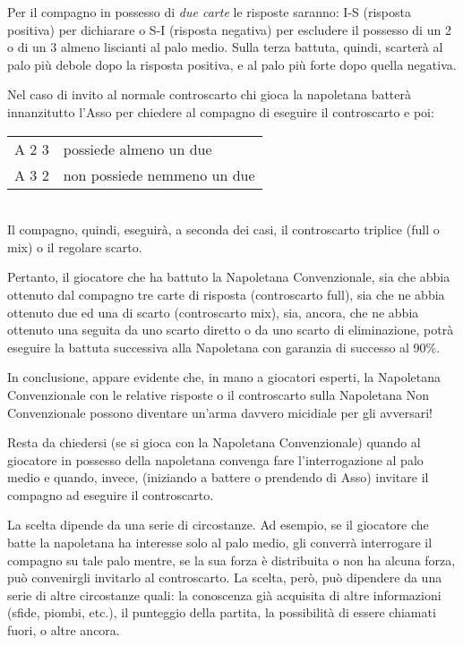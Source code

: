 \documentclass[italian,a4paper]{article}
\begin{document}
Per il compagno in possesso di \emph{due carte} le risposte saranno: I-S (risposta positiva) per dichiarare o S-I (risposta negativa) per escludere il possesso di un 2 o di un 3 almeno liscianti al palo medio.
Sulla terza battuta, quindi, scarterà al palo più debole dopo la
risposta positiva, e al palo più forte dopo quella negativa.

Nel caso di invito al normale controscarto chi gioca la napoletana batterà innanzitutto l'Asso per chiedere al compagno di eseguire il controscarto e poi:
\begin{table}[h]
    \centering
    \begin{tabular}{cl}
        A 2 3 &  possiede almeno un due\\
        A 3 2 &  non possiede nemmeno un due\\
    \end{tabular}
\end{table}\\
Il compagno, quindi, eseguirà, a seconda dei casi, il controscarto triplice (full o mix) o il regolare scarto.

Pertanto, il giocatore che ha battuto la Napoletana Convenzionale, sia che
abbia ottenuto dal compagno tre carte di risposta (controscarto full), sia
che ne abbia ottenuto due ed una di scarto (controscarto mix), sia,
ancora, che ne abbia ottenuto una seguita da uno scarto diretto o da uno
scarto di eliminazione, potrà eseguire la battuta successiva alla
Napoletana con garanzia di successo al 90\%.
 
In conclusione, appare evidente che, in mano a giocatori esperti, la Napoletana Convenzionale con le relative risposte o il controscarto sulla Napoletana Non Convenzionale possono diventare un'arma davvero micidiale per gli avversari!
 
Resta da chiedersi (se si gioca con la Napoletana Convenzionale) quando al giocatore in possesso della napoletana convenga fare l'interrogazione al palo medio e quando, invece, (iniziando a battere o prendendo di Asso) invitare il compagno ad eseguire il controscarto.
 
La scelta dipende da una serie di circostanze. Ad esempio, se il giocatore che batte la napoletana ha interesse solo al palo medio, gli converrà interrogare il compagno su tale palo mentre, se la sua forza è distribuita o non ha alcuna forza, può convenirgli invitarlo al controscarto.
La scelta, però, può dipendere da una serie di altre circostanze quali: la
conoscenza già acquisita di altre informazioni (sfide, piombi, etc.), il
punteggio della partita, la possibilità di essere chiamati fuori, o altre
ancora.
\end{document}
